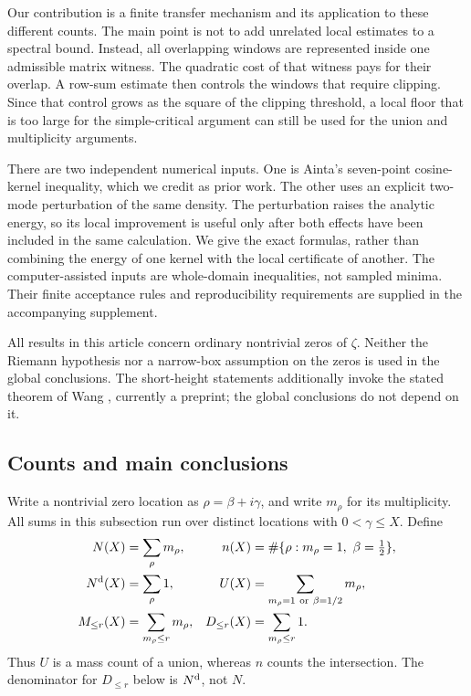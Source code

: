 \documentclass[11pt]{amsart}
\numberwithin{equation}{section}
\newcommand{\Nd}{N^{\rm d}}
\begin{document}
Our contribution is a finite transfer mechanism and its application to these
different counts. The main point is not to add unrelated local estimates to
a spectral bound. Instead, all overlapping windows are represented inside
one admissible matrix witness. The quadratic cost of that witness pays for
their overlap. A row-sum estimate then controls the windows that require
clipping. Since that control grows as the square of the clipping threshold,
a local floor that is too large for the simple-critical argument can still
be used for the union and multiplicity arguments.

There are two independent numerical inputs. One is Ainta's seven-point
cosine-kernel inequality, which we credit as prior work. The other uses an
explicit two-mode perturbation of the same density. The perturbation raises
the analytic energy, so its local improvement is useful only after both
effects have been included in the same calculation. We give the exact
formulas, rather than combining the energy of one kernel with the local
certificate of another. The computer-assisted inputs are whole-domain
inequalities, not sampled minima. Their finite acceptance rules and
reproducibility requirements are supplied in the accompanying supplement.

All results in this article concern ordinary nontrivial zeros of $\zeta$.
Neither the Riemann hypothesis nor a narrow-box assumption on the zeros is
used in the global conclusions. The short-height statements additionally
invoke the stated theorem of Wang \cite{Wang}, currently a preprint; the
global conclusions do not depend on it.

\subsection{Counts and main conclusions}

Write a nontrivial zero location as $\rho=\beta+i\gamma$, and write
$m_\rho$ for its multiplicity. All sums in this subsection run over distinct
locations with $0<\gamma\le X$. Define
\begin{align}
 N(X)&=\sum_\rho m_\rho,&
 n(X)&=\#\{\rho:m_\rho=1,\ \beta=\tfrac12\},\label{eq:counts1}\\
 \Nd(X)&=\sum_\rho1,&
 U(X)&=\sum_{m_\rho=1\ \text{or}\ \beta=1/2}m_\rho,\label{eq:counts2}\\
 M_{\le r}(X)&=\sum_{m_\rho\le r}m_\rho,&
 D_{\le r}(X)&=\sum_{m_\rho\le r}1.\label{eq:counts3}
\end{align}
Thus $U$ is a mass count of a union, whereas $n$ counts the intersection.
The denominator for $D_{\le r}$ below is $\Nd$, not $N$.
\end{document}
